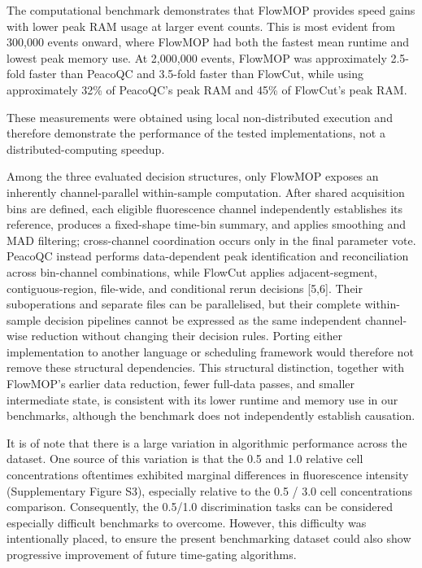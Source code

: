 \documentclass[ASNA]{latex/wiley/USG}
\begin{document}
The computational benchmark demonstrates that FlowMOP provides speed
gains with lower peak RAM usage at larger event counts. This is most
evident from 300,000 events onward, where FlowMOP had both the fastest
mean runtime and lowest peak memory use. At 2,000,000 events, FlowMOP
was approximately 2.5-fold faster than PeacoQC and 3.5-fold faster than
FlowCut, while using approximately 32\% of PeacoQC's peak RAM and 45\%
of FlowCut's peak RAM.

These measurements were obtained using local non-distributed execution
and therefore demonstrate the performance of the tested implementations,
not a distributed-computing speedup.

Among the three evaluated decision structures, only FlowMOP exposes an
inherently channel-parallel within-sample computation. After shared
acquisition bins are defined, each eligible fluorescence channel
independently establishes its reference, produces a fixed-shape time-bin
summary, and applies smoothing and MAD filtering; cross-channel
coordination occurs only in the final parameter vote. PeacoQC instead
performs data-dependent peak identification and reconciliation across
bin-channel combinations, while FlowCut applies adjacent-segment,
contiguous-region, file-wide, and conditional rerun decisions {[}5,6{]}.
Their suboperations and separate files can be parallelised, but their
complete within-sample decision pipelines cannot be expressed as the
same independent channel-wise reduction without changing their decision
rules. Porting either implementation to another language or scheduling
framework would therefore not remove these structural dependencies. This
structural distinction, together with FlowMOP's earlier data reduction,
fewer full-data passes, and smaller intermediate state, is consistent
with its lower runtime and memory use in our benchmarks, although the
benchmark does not independently establish causation.

It is of note that there is a large variation in algorithmic performance
across the dataset. One source of this variation is that the 0.5 and 1.0
relative cell concentrations oftentimes exhibited marginal differences
in fluorescence intensity (Supplementary Figure S3), especially relative
to the 0.5 / 3.0 cell concentrations comparison. Consequently, the
0.5/1.0 discrimination tasks can be considered especially difficult
benchmarks to overcome. However, this difficulty was intentionally
placed, to ensure the present benchmarking dataset could also show
progressive improvement of future time-gating algorithms.
\end{document}
